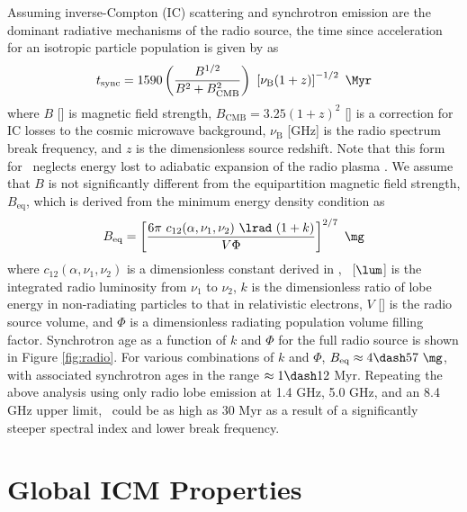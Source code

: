 \documentclass[useAMS,usenatbib]{mn2e}
\begin{document}
Assuming inverse-Compton (IC) scattering and synchrotron emission are
the dominant radiative mechanisms of the radio source, the time since
acceleration for an isotropic particle population is given by
\citet{2001AJ....122.1172S} as
\begin{equation}
  \tsync = 1590 \left(\frac{B^{1/2}}{B^2 + B_{\mathrm{CMB}}^2}\right)~
  \left[\nu_{\mathrm{B}} (1+z)\right]^{-1/2} ~\Myr
\end{equation}
where $B$ [\mg] is magnetic field strength, $B_{\mathrm{CMB}} =
3.25(1+z)^2$ [\mg] is a correction for IC losses to the cosmic
microwave background, $\nu_{\mathrm{B}}$ [GHz] is the radio spectrum
break frequency, and $z$ is the dimensionless source redshift. Note
that this form for \tsync\ neglects energy lost to adiabatic expansion
of the radio plasma \citep{1968ARA&A...6..321S}. We assume that $B$ is
not significantly different from the equipartition magnetic field
strength, $B_{\mathrm{eq}}$, which is derived from the minimum energy
density condition as \citep{1980ARA&A..18..165M}
\begin{equation}
  B_{\mathrm{eq}} = \left[\frac{6 \pi ~c_{12}(\alpha,\nu_1, \nu_2)
      ~\lrad ~(1+k)}{V \Phi}\right]^{2/7} ~\mathrm{\mg}
\end{equation}
where $c_{12}(\alpha,\nu_1,\nu_2)$ is a dimensionless constant derived
in \citet{pach}, \lrad\ [$\lum$] is the integrated radio luminosity
from $\nu_1$ to $\nu_2$, $k$ is the dimensionless ratio of lobe energy
in non-radiating particles to that in relativistic electrons, $V$
[\cc] is the radio source volume, and $\Phi$ is a dimensionless
radiating population volume filling factor. Synchrotron age as a
function of $k$ and $\Phi$ for the full radio source is shown in
Figure \ref{fig:radio}. For various combinations of $k$ and $\Phi$,
$B_{\mathrm{eq}} \approx 4 \dash 57 ~\mg$, with associated synchrotron
ages in the range $\approx 1 \dash 12$ Myr. Repeating the above
analysis using only radio lobe emission at 1.4 GHz, 5.0 GHz, and an
8.4 GHz upper limit, \tsync\ could be as high as $30$ Myr as a result
of a significantly steeper spectral index and lower break frequency.

\section{Global ICM Properties}
\label{sec:global}
\end{document}
